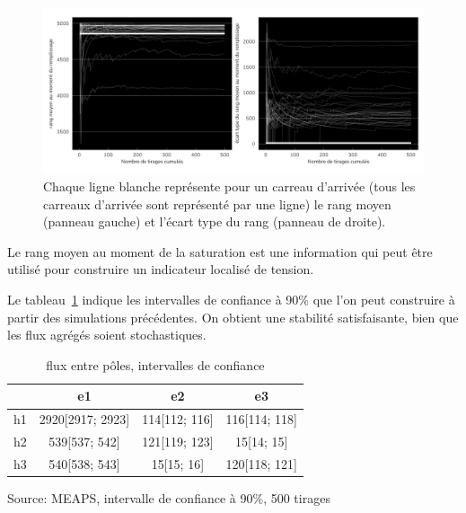 \documentclass[
  10pt,
  a4paper,
  numbers=noendperiod,
  DIV=9]{scrreprt}
\begin{document}
\begin{figure}[htb]

{\centering \includegraphics[width=1\textwidth,height=\textheight]{./output/g_rangns.png}

}

\caption[Rang au moment de la saturation]{\label{fig-rangerg}Chaque
ligne blanche représente pour un carreau d'arrivée (tous les carreaux
d'arrivée sont représenté par une ligne) le rang moyen (panneau gauche)
et l'écart type du rang (panneau de droite).}

\end{figure}

Le rang moyen au moment de la saturation est une information qui peut
être utilisé pour construire un indicateur localisé de tension.

Le tableau~\ref{tbl-fluxpoles_conf} indique les intervalles de confiance
à 90\% que l'on peut construire à partir des simulations précédentes. On
obtient une stabilité satisfaisante, bien que les flux agrégés soient
stochastiques.

\hypertarget{tbl-fluxpoles_conf}{}
\setlength{\LTpost}{0mm}
\begin{longtable}{lccc}
\caption{\label{tbl-fluxpoles_conf}flux entre pôles, intervalles de confiance }\tabularnewline

\toprule
 & e1 & e2 & e3 \\ 
\midrule
h1 & 2920{[}2917; 2923{]} & 114{[}112; 116{]} & 116{[}114; 118{]} \\ 
h2 & 539{[}537; 542{]} & 121{[}119; 123{]} & 15{[}14; 15{]} \\ 
h3 & 540{[}538; 543{]} & 15{[}15; 16{]} & 120{[}118; 121{]} \\ 
\bottomrule
\end{longtable}
\begin{minipage}{\linewidth}
Source: MEAPS, intervalle de confiance à 90\%, 500 tirages\\
\end{minipage}
\end{document}

